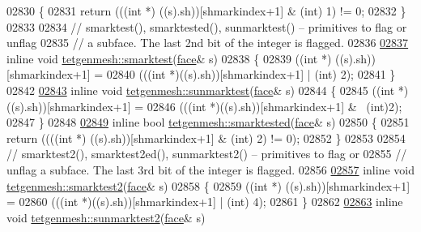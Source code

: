 \begin{DoxyCode}
02830 \{
02831   \textcolor{keywordflow}{return} (((\textcolor{keywordtype}{int} *) ((s).sh))[shmarkindex+1] & (\textcolor{keywordtype}{int}) 1) != 0;
02832 \}
02833 
02834 \textcolor{comment}{// smarktest(), smarktested(), sunmarktest() -- primitives to flag or unflag}
02835 \textcolor{comment}{//   a subface. The last 2nd bit of the integer is flagged.}
02836 
\hypertarget{tetgen_8h_source.tex_l02837}{}\hyperlink{classtetgenmesh_aaa4ab339abe7e5806acb54f28d9ee915}{02837} \textcolor{keyword}{inline} \textcolor{keywordtype}{void} \hyperlink{classtetgenmesh_aaa4ab339abe7e5806acb54f28d9ee915}{tetgenmesh::smarktest}(\hyperlink{classtetgenmesh_1_1face}{face}& s) 
02838 \{
02839   ((\textcolor{keywordtype}{int} *) ((s).sh))[shmarkindex+1] = 
02840     (((\textcolor{keywordtype}{int} *)((s).sh))[shmarkindex+1] | (int) 2);
02841 \}
02842 
\hypertarget{tetgen_8h_source.tex_l02843}{}\hyperlink{classtetgenmesh_a95a2ff1dc65e9cf6fc45de667ecf1b48}{02843} \textcolor{keyword}{inline} \textcolor{keywordtype}{void} \hyperlink{classtetgenmesh_a95a2ff1dc65e9cf6fc45de667ecf1b48}{tetgenmesh::sunmarktest}(\hyperlink{classtetgenmesh_1_1face}{face}& s) 
02844 \{
02845   ((\textcolor{keywordtype}{int} *) ((s).sh))[shmarkindex+1] = 
02846     (((\textcolor{keywordtype}{int} *)((s).sh))[shmarkindex+1] & ~(int)2);
02847 \}
02848 
\hypertarget{tetgen_8h_source.tex_l02849}{}\hyperlink{classtetgenmesh_abba717b23bb986de6fd9ba7caabbc57f}{02849} \textcolor{keyword}{inline} \textcolor{keywordtype}{bool} \hyperlink{classtetgenmesh_abba717b23bb986de6fd9ba7caabbc57f}{tetgenmesh::smarktested}(\hyperlink{classtetgenmesh_1_1face}{face}& s) 
02850 \{
02851   \textcolor{keywordflow}{return} ((((\textcolor{keywordtype}{int} *) ((s).sh))[shmarkindex+1] & (\textcolor{keywordtype}{int}) 2) != 0);
02852 \}
02853 
02854 \textcolor{comment}{// smarktest2(), smarktest2ed(), sunmarktest2() -- primitives to flag or }
02855 \textcolor{comment}{//   unflag a subface. The last 3rd bit of the integer is flagged.}
02856 
\hypertarget{tetgen_8h_source.tex_l02857}{}\hyperlink{classtetgenmesh_a00988e7fce3b262e64921568b792f876}{02857} \textcolor{keyword}{inline} \textcolor{keywordtype}{void} \hyperlink{classtetgenmesh_a00988e7fce3b262e64921568b792f876}{tetgenmesh::smarktest2}(\hyperlink{classtetgenmesh_1_1face}{face}& s) 
02858 \{
02859   ((\textcolor{keywordtype}{int} *) ((s).sh))[shmarkindex+1] = 
02860     (((\textcolor{keywordtype}{int} *)((s).sh))[shmarkindex+1] | (int) 4);
02861 \}
02862 
\hypertarget{tetgen_8h_source.tex_l02863}{}\hyperlink{classtetgenmesh_a9f9c756258b8714e8e699da3168f3243}{02863} \textcolor{keyword}{inline} \textcolor{keywordtype}{void} \hyperlink{classtetgenmesh_a9f9c756258b8714e8e699da3168f3243}{tetgenmesh::sunmarktest2}(\hyperlink{classtetgenmesh_1_1face}{face}& s) 

\end{DoxyCode}
